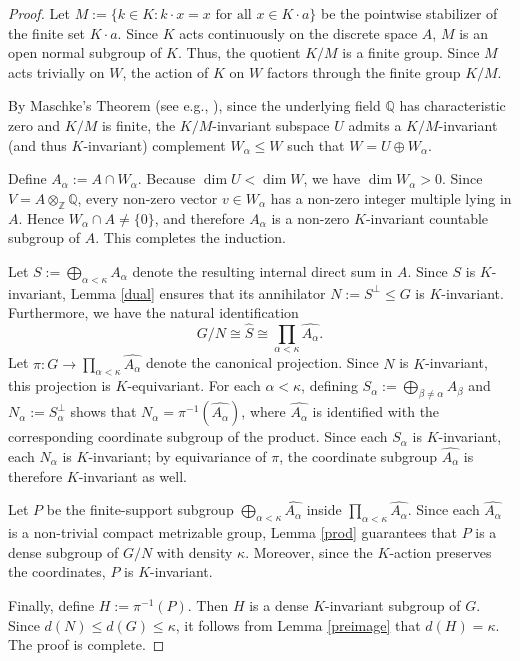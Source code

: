 \documentclass[12pt]{amsart}
\theoremstyle{definition}
\numberwithin{equation}{section}
\theoremstyle{remark}
\begin{document}
\begin{proof}
Let $M := \{k \in K : k \cdot x = x \text{ for all } x \in K \cdot a\}$ be the pointwise stabilizer of the finite set $K \cdot a$. Since $K$ acts continuously on the discrete space $A$, $M$ is an open normal subgroup of $K$. Thus, the quotient $K/M$ is a finite group. Since $M$ acts trivially on $W$, the action of $K$ on $W$ factors through the finite group $K/M$. 

By Maschke's Theorem (see e.g., \cite[p. 116]{AB}), since the underlying field $\mathbb{Q}$ has characteristic zero and $K/M$ is finite, the $K/M$-invariant subspace $U$ admits a $K/M$-invariant (and thus $K$-invariant) complement $W_\alpha \leq W$ such that $W = U \oplus W_\alpha$. 

Define $A_\alpha := A \cap W_\alpha$. Because $\dim U < \dim W$, we have $\dim W_\alpha > 0$. Since $V=A\otimes_{\mathbb Z}\mathbb Q$, every non-zero vector $v\in W_\alpha$ has a non-zero integer multiple lying in $A$. Hence $W_\alpha\cap A\neq\{0\}$, and therefore $A_\alpha$ is a non-zero $K$-invariant countable subgroup of $A$. This completes the induction.

Let $S := \bigoplus_{\alpha < \kappa} A_\alpha$ denote the resulting internal direct sum in $A$. Since $S$ is $K$-invariant, Lemma \ref{dual} ensures that its annihilator $N := S^\perp \leq G$ is $K$-invariant. Furthermore, we have the natural identification
\[ G/N \cong \widehat{S} \cong \prod_{\alpha < \kappa} \widehat{A_\alpha}. \]
Let $\pi: G \to \prod_{\alpha < \kappa} \widehat{A_\alpha}$ denote the canonical projection. Since $N$ is $K$-invariant, this projection is $K$-equivariant. For each $\alpha < \kappa$, defining $S_\alpha := \bigoplus_{\beta \neq \alpha} A_\beta$ and $N_\alpha := S_\alpha^\perp$ shows that $N_\alpha = \pi^{-1}(\widehat{A_\alpha})$, where $\widehat{A_\alpha}$ is identified with the corresponding coordinate subgroup of the product. Since each $S_\alpha$ is $K$-invariant, each $N_\alpha$ is $K$-invariant; by equivariance of $\pi$, the coordinate subgroup $\widehat{A_\alpha}$ is therefore $K$-invariant as well.

Let $P$ be the finite-support subgroup $\bigoplus_{\alpha<\kappa}\widehat{A_\alpha}$ inside $\prod_{\alpha < \kappa} \widehat{A_\alpha}$. Since each $\widehat{A_\alpha}$ is a non-trivial compact metrizable group, Lemma \ref{prod} guarantees that $P$ is a dense subgroup of $G/N$ with density $\kappa$. Moreover, since the $K$-action preserves the coordinates, $P$ is $K$-invariant.

Finally, define $H := \pi^{-1}(P)$. Then $H$ is a dense $K$-invariant subgroup of $G$. Since $d(N) \leq d(G) \leq \kappa$, it follows from Lemma \ref{preimage} that $d(H) = \kappa$. The proof is complete.
\end{proof}
\end{document}
